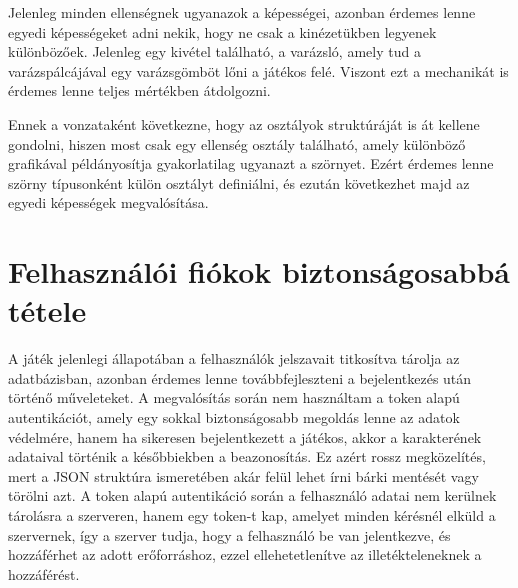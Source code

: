 \indent \indent Jelenleg minden ellenségnek ugyanazok a képességei, azonban érdemes lenne egyedi képességeket adni nekik, hogy ne csak a kinézetükben legyenek különbözőek. Jelenleg egy kivétel található, a varázsló, amely tud a varázspálcájával egy varázsgömböt lőni a játékos felé. Viszont ezt a mechanikát is érdemes lenne teljes mértékben átdolgozni.

Ennek a vonzataként következne, hogy az osztályok struktúráját is át kellene gondolni, hiszen most csak egy ellenség osztály található, amely különböző grafikával példányosítja gyakorlatilag ugyanazt a szörnyet. Ezért érdemes lenne szörny típusonként külön osztályt definiálni, és ezután következhet majd az egyedi képességek megvalósítása.

\section{Felhasználói fiókok biztonságosabbá tétele}
\indent \indent A játék jelenlegi állapotában a felhasználók jelszavait titkosítva tárolja az adatbázisban, azonban érdemes lenne továbbfejleszteni a bejelentkezés után történő műveleteket. A megvalósítás során nem használtam a token alapú autentikációt, amely egy sokkal biztonságosabb megoldás lenne az adatok védelmére, hanem ha sikeresen bejelentkezett a játékos, akkor a karakterének adataival történik a későbbiekben a beazonosítás. Ez azért rossz megközelítés, mert a JSON struktúra ismeretében akár felül lehet írni bárki mentését vagy törölni azt. A token alapú autentikáció során a felhasználó adatai nem kerülnek tárolásra a szerveren, hanem egy token-t kap, amelyet minden kérésnél elküld a szervernek, így a szerver tudja, hogy a felhasználó be van jelentkezve, és hozzáférhet az adott erőforráshoz, ezzel ellehetetlenítve az illetékteleneknek a hozzáférést. 